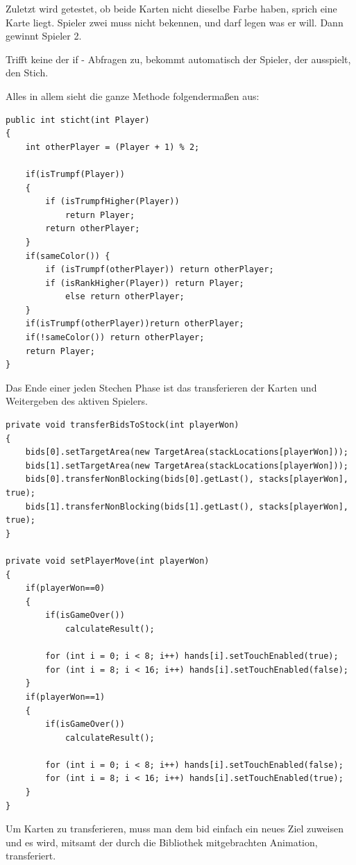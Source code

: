 Zuletzt wird getestet, ob beide Karten nicht dieselbe Farbe haben, sprich eine
Karte liegt. Spieler zwei muss nicht bekennen, und darf legen was er will. Dann
gewinnt Spieler 2.

Trifft keine der if - Abfragen zu, bekommt automatisch der Spieler, der
ausspielt, den Stich.

Alles in allem sieht die ganze Methode folgendermaßen aus:

\begin{lstlisting}[caption={sticht() Methode},captionpos=b]
public int sticht(int Player)
{
    int otherPlayer = (Player + 1) % 2;

    if(isTrumpf(Player))
    {
        if (isTrumpfHigher(Player))
            return Player;
        return otherPlayer;
    }
    if(sameColor()) {
        if (isTrumpf(otherPlayer)) return otherPlayer;
        if (isRankHigher(Player)) return Player;
            else return otherPlayer;
    }
    if(isTrumpf(otherPlayer))return otherPlayer;
    if(!sameColor()) return otherPlayer;
    return Player;
}
\end{lstlisting}

Das Ende einer jeden Stechen Phase ist das transferieren der Karten und
Weitergeben des aktiven Spielers.

\begin{lstlisting}[caption={TransferBidsToStock und setPlayerMove},captionpos=b]
private void transferBidsToStock(int playerWon)
{
    bids[0].setTargetArea(new TargetArea(stackLocations[playerWon]));
    bids[1].setTargetArea(new TargetArea(stackLocations[playerWon]));
    bids[0].transferNonBlocking(bids[0].getLast(), stacks[playerWon], true);
    bids[1].transferNonBlocking(bids[1].getLast(), stacks[playerWon], true);
}

private void setPlayerMove(int playerWon)
{
    if(playerWon==0)
    {
        if(isGameOver())
            calculateResult();

        for (int i = 0; i < 8; i++) hands[i].setTouchEnabled(true);
        for (int i = 8; i < 16; i++) hands[i].setTouchEnabled(false);
    }
    if(playerWon==1)
    {
        if(isGameOver())
            calculateResult();

        for (int i = 0; i < 8; i++) hands[i].setTouchEnabled(false);
        for (int i = 8; i < 16; i++) hands[i].setTouchEnabled(true);
    }
}
\end{lstlisting}

Um Karten zu transferieren, muss man dem bid einfach ein neues Ziel zuweisen und
es wird, mitsamt der durch die Bibliothek mitgebrachten Animation, transferiert.

